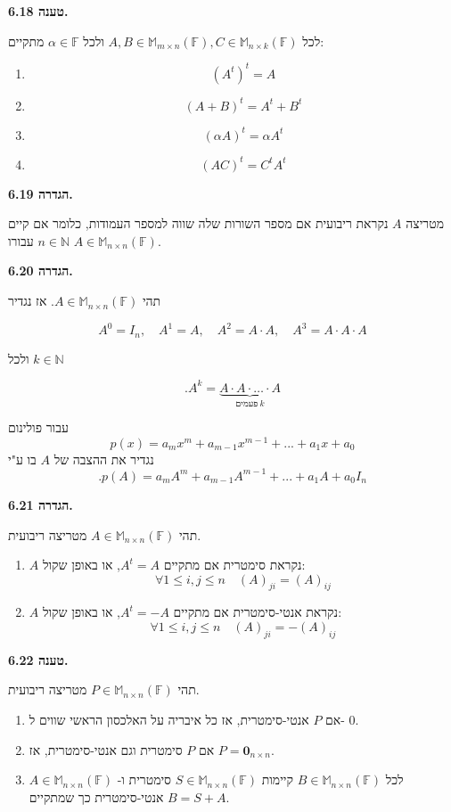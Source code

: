 \documentclass[12pt]{report}
\theoremstyle{plain}
\theoremstyle{definition}
\newcommand{\N}{\mathbb{N}}
\newcommand{\F}{\mathbb{F}}
\newcommand{\M}{\mathbb{M}}
\newcommand{\0}{\mathbf{0}}
\begin{document}
\noindent\textbf{טענה 6.18.}

לכל 
$A,B\in\M_{m\times n}(\F), C\in\M_{n\times k}(\F)$
ולכל
$\alpha\in\F$
מתקיים:
\begin{enumerate}[label=\alph*.]
\item 
$$
(A^t)^t=A
$$


\item 
$$
(A+B)^t=A^t+B^t
$$

\item 
$$
(\alpha A)^t=\alpha A^t
$$


\item 
$$
(AC)^t=C^tA^t
$$


\end{enumerate}
\bigskip
\bigskip

\noindent\textbf{הגדרה 6.19.}

מטריצה 
$A$
נקראת ריבועית אם מספר השורות שלה שווה למספר העמודות, כלומר אם קיים 
$n\in\N$
עבורו
$A\in\M_{n\times n}(\F)$.
\bigskip
\bigskip

\noindent\textbf{הגדרה 6.20.}

תהי 
$A\in\M_{n\times n}(\F)$.
אז נגדיר 

$$
A^0=I_n, \quad A^1=A, \quad A^2=A\cdot A, \quad A^3=A\cdot A\cdot A
$$

ולכל
$k\in\N$

$$
.A^k = \underbrace{A \cdot A \cdot \ldots \cdot A}_{\text{פעמים} \ k}
$$

עבור פולינום
$$
p(x)=a_mx^m+a_{m-1}x^{m-1}+...+a_1x+a_0
$$
נגדיר את ההצבה של
$A$
בו ע"י
$$
.p(A)=a_mA^m+a_{m-1}A^{m-1}+...+a_1A+a_0I_n
$$
\bigskip
\bigskip

\noindent\textbf{הגדרה 6.21.}

תהי 
$A\in\M_{n\times n}(\F)$
מטריצה ריבועית.

\begin{enumerate}[label=\alph*.]
\item
$A$
נקראת סימטרית אם מתקיים
$A^t=A$,
או באופן שקול:
$$
\forall 1\leq i,j\leq n \quad (A)_{ji}=(A)_{ij}
$$


\item 
$A$
נקראת אנטי-סימטרית אם מתקיים
$A^t=-A$,
או באופן שקול:
$$
\forall 1\leq i,j\leq n \quad (A)_{ji}=-(A)_{ij}
$$

\end{enumerate}
\bigskip
\bigskip

\noindent\textbf{טענה 6.22.}

תהי
$P\in\M_{n\times n}(\F)$
מטריצה ריבועית.
\begin{enumerate}[label=\alph*.]
\item
אם
$P$
אנטי-סימטרית, אז כל איבריה על האלכסון הראשי שווים ל-
$0$.


\item 
אם
$P$
סימטרית וגם אנטי-סימטרית, אז
$P=\0_{n\times n}$.


\item 
לכל
$B\in\M_{n\times n}(\F)$
קיימות
$S\in\M_{n\times n}(\F)$
סימטרית ו-
$A\in\M_{n\times n}(\F)$
אנטי-סימטרית כך שמתקיים
$B=S+A$.


\end{enumerate}
\bigskip
\bigskip
\end{document}
